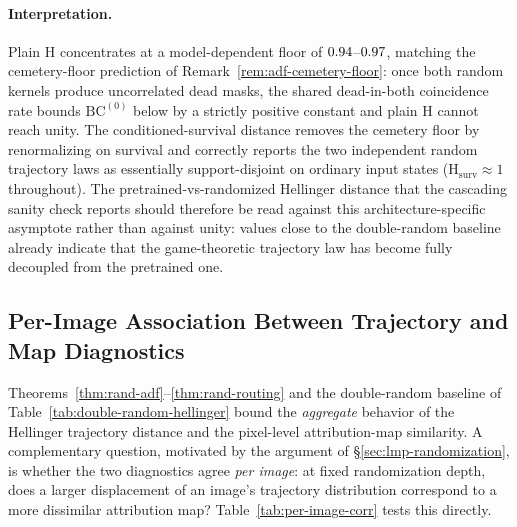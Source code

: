 \documentclass[twoside]{article}
\newcommand{\1}{\mathbf{1}}
\begin{document}
\paragraph{Interpretation.}
Plain $\mathrm{H}$ concentrates at a model-dependent floor of $0.94$--$0.97$,
matching the cemetery-floor prediction of Remark~\ref{rem:adf-cemetery-floor}: once both random
kernels produce uncorrelated dead masks, the shared dead-in-both coincidence rate bounds
$\mathrm{BC}^{(0)}$ below by a strictly positive constant and plain $\mathrm{H}$ cannot reach
unity.  The conditioned-survival distance removes the cemetery floor by renormalizing on survival
and correctly reports the two independent random trajectory laws as essentially support-disjoint on
ordinary input states ($\mathrm{H}_{\mathrm{surv}} \approx 1$ throughout).  The
pretrained-vs-randomized Hellinger distance that the cascading sanity check reports should
therefore be read against this architecture-specific asymptote rather than against unity: values
close to the double-random baseline already indicate that the game-theoretic trajectory law has
become fully decoupled from the pretrained one.

\subsection{Per-Image Association Between Trajectory and Map Diagnostics}\label{sec:per-image-orthogonality}

Theorems~\ref{thm:rand-adf}--\ref{thm:rand-routing} and the double-random baseline of
Table~\ref{tab:double-random-hellinger} bound the \emph{aggregate} behavior of the Hellinger
trajectory distance and the pixel-level attribution-map similarity.  A complementary question, motivated by the
argument of \S\ref{sec:lmp-randomization}, is whether the two diagnostics agree \emph{per
image}: at fixed randomization depth, does a larger displacement of an image's trajectory
distribution correspond to a more dissimilar attribution map?  Table~\ref{tab:per-image-corr} tests this directly.
\end{document}

